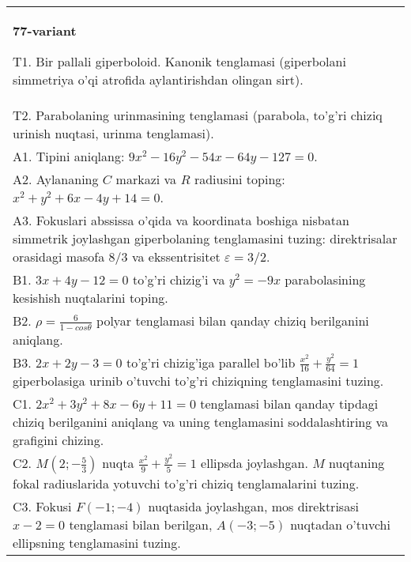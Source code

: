 \documentclass{article}
\begin{document}
\begin{tabular}{m{17cm}}
\textbf{77-variant}
\newline

T1. Bir pallali giperboloid. Kanonik tenglamasi (giperbolani simmetriya o'qi atrofida aylantirishdan olingan sirt).\\

T2. Parabolaning urinmasining tenglamasi (parabola, to'g'ri chiziq urinish nuqtasi, urinma tenglamasi).\\

A1. Tipini aniqlang: $9x^{2}-16y^{2}-54x-64y-127=0$.\\

A2. Aylananing $C$ markazi va $R$ radiusini toping: $x^2+y^2+6x-4y+14=0$.\\

A3. Fokuslari abssissa o'qida va koordinata boshiga nisbatan simmetrik joylashgan giperbolaning tenglamasini tuzing: direktrisalar orasidagi masofa $8/3$ va ekssentrisitet $\varepsilon=3/2$.\\

B1. $3x + 4y - 12 = 0$ to'g'ri chizig'i va $y^{2} = - 9x$ parabolasining kesishish nuqtalarini toping.\\

B2. $\rho = \frac{6}{1 - cos\theta}$ polyar tenglamasi bilan qanday chiziq berilganini aniqlang.  \\

B3. $2x + 2y - 3 = 0$ to'g'ri chizig'iga parallel bo'lib $\frac{x^{2}}{16} + \frac{y^{2}}{64} = 1$ giperbolasiga urinib o'tuvchi to'g'ri chiziqning tenglamasini tuzing.  \\

C1. $2x^{2} + 3y^{2} + 8x - 6y + 11 = 0$ tenglamasi bilan qanday tipdagi chiziq berilganini aniqlang va uning tenglamasini soddalashtiring va grafigini chizing.  \\

C2. $M(2; - \frac{5}{3})$ nuqta $\frac{x^{2}}{9} + \frac{y^{2}}{5} = 1$ ellipsda joylashgan. $M$ nuqtaning fokal radiuslarida yotuvchi to'g'ri chiziq tenglamalarini tuzing.  \\

C3. Fokusi $F( - 1; - 4)$ nuqtasida joylashgan, mos direktrisasi $x - 2 = 0$ tenglamasi bilan berilgan, $A( - 3; - 5)$ nuqtadan o'tuvchi ellipsning tenglamasini tuzing.  \\

\end{tabular}
\vspace{1cm}
\end{document}
